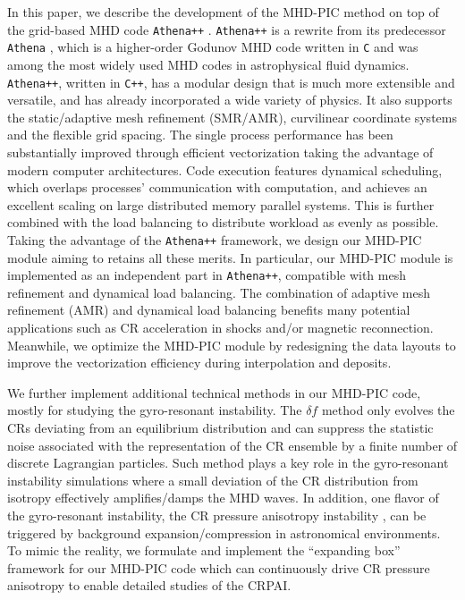 \documentclass[fleqn,usenatbib]{mnras}
\begin{document}
In this paper, we describe the development of the MHD-PIC method on top of the grid-based MHD code \texttt{Athena++} \citep{2020ApJS..249....4S}. \texttt{Athena++} is a rewrite from its predecessor \texttt{Athena} \citep{2008ApJS..178..137S}, which is a higher-order Godunov MHD code written in \texttt{C} and was among the most widely used MHD codes in astrophysical fluid dynamics.
\texttt{Athena++}, written in \texttt{C++}, has a modular design that is much more extensible and versatile, and has already incorporated a wide variety of physics.
It also supports the static/adaptive mesh refinement (SMR/AMR), curvilinear coordinate systems and the flexible grid spacing. 
The single process performance has been substantially improved through efficient vectorization taking the advantage of modern computer architectures. Code execution features dynamical scheduling, which overlaps processes' communication with computation, and achieves an excellent scaling on large distributed memory parallel systems. This is further combined with the load balancing to distribute workload as evenly as possible.
Taking the advantage of the \texttt{Athena++} framework, we design our MHD-PIC module aiming to retains all these merits. In particular, 
our MHD-PIC module is implemented as an independent part in \texttt{Athena++}, compatible with mesh refinement and dynamical load balancing.
The combination of adaptive mesh refinement (AMR) and dynamical load balancing benefits many potential applications such as CR acceleration in shocks \citep[e.g.,][]{2018MNRAS.473.3394V} and/or magnetic reconnection. Meanwhile, we optimize the MHD-PIC module by redesigning the data layouts to improve the vectorization efficiency during interpolation and deposits.



We further implement additional technical methods in our MHD-PIC code, mostly for studying the gyro-resonant instability. The $\delta f$ method \citep[e.g.][]{1993PhFlB...5...77P, 1994PhPl....1..863H, 1995JCoPh.119..283D, 2014JCoPh.259..154K, 2019ApJ...876...60B} only evolves the CRs deviating from an equilibrium distribution and can suppress the statistic noise associated with the representation of the CR ensemble by a finite number of discrete Lagrangian particles. Such method plays a key role in the gyro-resonant instability simulations where a small deviation of the CR distribution from isotropy effectively amplifies/damps the MHD waves. In addition, one flavor of the gyro-resonant instability, the CR pressure anisotropy instability \citep[CRPAI, ][]{2006MNRAS.373.1195L, 2011ApJ...731...35Y, 2020ApJ...890...67Z}, can be triggered by background
expansion/compression in astronomical environments. 
To mimic the reality, we formulate and implement the ``expanding box'' framework \citep{1993PhRvL..70.2190G, 2015ApJ...800...88S, 2021ApJ...922L..35B} for our MHD-PIC code which can continuously drive CR pressure anisotropy to enable detailed studies of the CRPAI.
\end{document}

